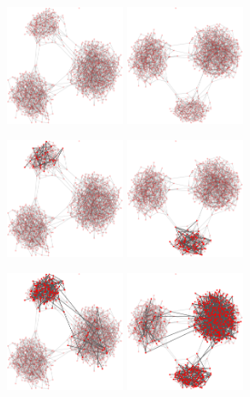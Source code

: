 \begin{figure}
\centering
\includegraphics[width=0.3\textwidth]{randomgraphnbrdepth1/network0-crop.pdf}
\hskip2cm
\includegraphics[width=0.3\textwidth]{randomgraphnbrdepth2/network0-crop.pdf}

\includegraphics[width=0.3\textwidth]{randomgraphnbrdepth1/network250-crop.pdf}
\hskip2cm
\includegraphics[width=0.3\textwidth]{randomgraphnbrdepth2/network250-crop.pdf}

\includegraphics[width=0.3\textwidth]{randomgraphnbrdepth1/network500-crop.pdf}
\hskip2cm
\includegraphics[width=0.3\textwidth]{randomgraphnbrdepth2/network500-crop.pdf}


\end{figure}
